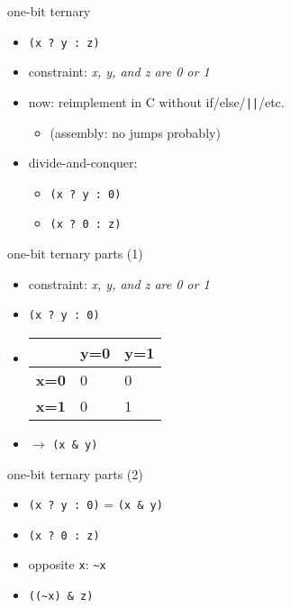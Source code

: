 \begin{frame}[fragile,label=exTernaryOneBit]{one-bit ternary}
\begin{itemize}
    \item \lstinline|(x ? y : z)|
    \item constraint: \textit{x, y, and z are 0 or 1}
    \item now: reimplement in C without if/else/\lstinline+||+/etc.
        \begin{itemize}
        \item (assembly: no jumps probably)
        \end{itemize}
    \vspace{.5cm}
    \item<2> divide-and-conquer:
        \begin{itemize}
            \item \lstinline|(x ? y : 0)|
            \item \lstinline|(x ? 0 : z)|
        \end{itemize}
\end{itemize}
\end{frame}

\begin{frame}[fragile,label=exTernaryOneBitParts]{one-bit ternary parts (1)}
\begin{itemize}
    \item constraint: \textit{x, y, and z are 0 or 1}
    \vspace{.5cm}
\item \lstinline|(x ? y : 0)| 
    \vspace{.5cm}
\item<2->
\begin{tabular}{r|ll}
    ~ & \bf y=0 & \bf y=1 \\ \hline
    \bf x=0 & 0 & 0 \\
    \bf x=1 & 0 & 1 \\
\end{tabular}
\item<2-> $\rightarrow$ \lstinline|(x & y)|
\end{itemize}
\end{frame}

\begin{frame}[fragile,label=exTernaryOneBitParts2]{one-bit ternary parts (2)}
\begin{itemize}
\item \lstinline|(x ? y : 0)| = \lstinline|(x & y)|
    \vspace{.5cm}
\item<2-> \lstinline|(x ? 0 : z)|
\item<2-> opposite \lstinline|x|: \lstinline|~x|
\item<2-> \lstinline|((~x) & z)|
\end{itemize}
\end{frame}

